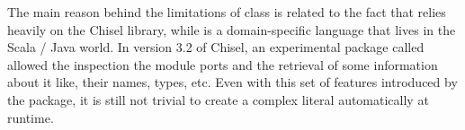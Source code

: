 The main reason behind the limitations of  class is related to
the fact that  relies heavily on the Chisel library, while
 is a domain-specific language that lives in the Scala / Java
world. In version 3.2 of Chisel, an experimental package called
 allowed the inspection the module ports and the retrieval of
some information about it like, their names, types, etc. Even with this set of
features introduced by the  package, it is still not trivial
to create a complex literal  automatically at runtime.
